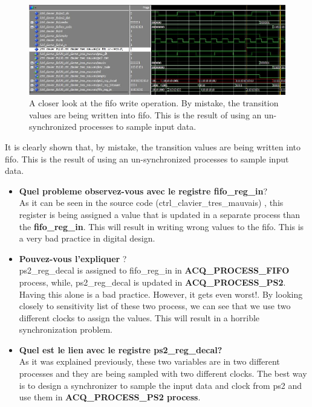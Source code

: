 \documentclass{rapportECL}
\begin{document}
\begin{figure}[h]
    \centering
    \includegraphics[width=15cm]{logos/top_part1.jpg}
    \caption{A closer look at the fifo write operation. By mistake, the transition values are being written into fifo. This is the result of using an un-synchronized processes to sample input data.}
    \label{fig:part1_mul_values_fifo}
\end{figure}
It is clearly shown that, by mistake, the transition values are being written into fifo. This is the result of using an un-synchronized processes to sample input data.

\begin{itemize}
    \item \textbf{Quel probleme observez-vous avec le registre fifo\_reg\_in}?\\ As it can be seen in the source code (ctrl\_clavier\_tres\_mauvais) , this register is being assigned a value that is updated in a separate process than the \textbf{fifo\_reg\_in}. This will result in writing wrong values to the fifo. This is a very bad practice in digital design.
    
    \item \textbf{Pouvez-vous l’expliquer} ?\\
    ps2\_reg\_decal is assigned to fifo\_reg\_in in \textbf{ACQ\_PROCESS\_FIFO} process, while, ps2\_reg\_decal is updated in \textbf{ACQ\_PROCESS\_PS2}. Having this alone is a bad practice. However, it gets even worst!. By looking closely to sensitivity list of these two process, we can see that we use two different clocks to assign the values. This will result in a horrible synchronization problem. 
    
    \item \textbf{Quel est le lien avec le registre ps2\_reg\_decal?}\\
    As it was explained previously, these two variables are in two different processes and they are being sampled with two different clocks. The best way is to design a synchronizer to sample the input data and clock from ps2 and use them in  \textbf{ACQ\_PROCESS\_PS2 process}.
\end{itemize}
\end{document}
